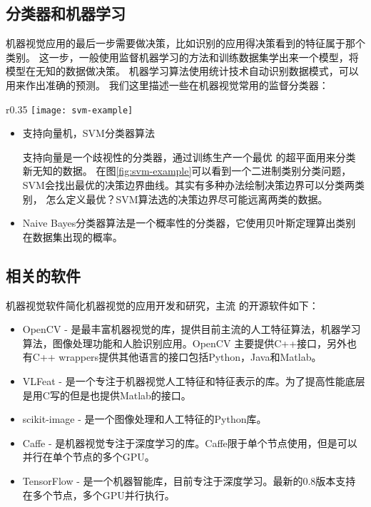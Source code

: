 \subsection{分类器和机器学习}
\label{subsubsec:classifier}
机器视觉应用的最后一步需要做决策，比如识别的应用得决策看到的特征属于那个类别。
这一步，一般使用监督机器学习的方法和训练数据集学出来一个模型，将模型在无知的数据做决策。
机器学习算法使用统计技术自动识别数据模式，可以用来作出准确的预测。
我们这里描述一些在机器视觉常用的监督分类器：
\begin{wrapfigure}{r}{0.35\textwidth}
            \centering
              \captionsetup{justification=centering}
              \texttt{[image: svm-example]}
              \caption{SVM选最优超平面。\cite{law2006simple}}
            \label{fig:svm-example}
          \end{wrapfigure}


\begin{itemize}
    \item 支持向量机，SVM分类器算法

          支持向量是一个歧视性的分类器，通过训练生产一个最优
          的超平面用来分类新无知的数据。\cite{law2006simple}
          在图\ref{fig:svm-example}可以看到一个二进制类别分类问题，
          SVM会找出最优的决策边界曲线。其实有多种办法绘制决策边界可以分类两类别，
          怎么定义最优？SVM算法选的决策边界尽可能远离两类的数据。

    \item Naive Bayes分类器算法是一个概率性的分类器，它使用贝叶斯定理算出类别在数据集出现的概率。
\end{itemize}

\subsection{相关的软件}
机器视觉软件简化机器视觉的应用开发和研究，主流
的开源软件如下：
\begin{itemize}
  \item OpenCV - 是最丰富机器视觉的库，提供目前主流的人工特征算法，机器学习算法，图像处理功能和人脸识别应用。OpenCV
        主要提供C++接口，另外也有C++ wrappers提供其他语言的接口包括Python，Java和Matlab。
  \item VLFeat - 是一个专注于机器视觉人工特征和特征表示的库。为了提高性能底层是用C写的但是也提供Matlab的接口。
  \item scikit-image - 是一个图像处理和人工特征的Python库。
  \item Caffe - 是机器视觉专注于深度学习的库。Caffe限于单个节点使用，但是可以并行在单个节点的多个GPU。
  \item TensorFlow - 是一个机器智能库，目前专注于深度学习。最新的0.8版本支持在多个节点，多个GPU并行执行。
\end{itemize}



